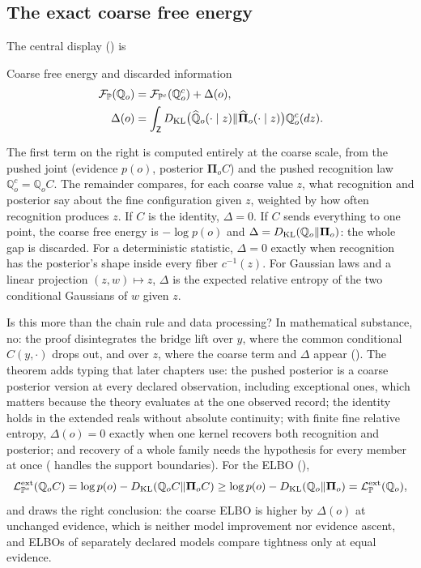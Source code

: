 \subsection{The exact coarse free energy}

The central display () is
\begin{keyequation}{Coarse free energy and discarded information}
\[
\begin{aligned}
\mathcal F_{\mathbb P}(\mathbb Q_o)
&=\mathcal F_{\mathbb P^c}(\mathbb Q^c_o)+\Delta(o),\\
\Delta(o)&=\int_{\mathsf Z}D_{\mathrm{KL}}\bigl(\widehat{\mathbb Q}_o(\cdot\mid z)\Vert\widehat{\boldsymbol\Pi}_o(\cdot\mid z)\bigr)\mathbb Q^c_o(dz).
\end{aligned}
\]
\end{keyequation}
The first term on the right is computed entirely at the coarse scale, from the pushed joint (evidence
$p(o)$, posterior $\boldsymbol\Pi_oC$) and the pushed recognition law $\mathbb Q^c_o=\mathbb Q_oC$. The
remainder compares, for each coarse value $z$, what recognition and posterior say about the fine
configuration given $z$, weighted by how often recognition produces $z$. If $C$ is the identity,
$\Delta=0$. If $C$ sends everything to one point, the coarse free energy is $-\log p(o)$ and
$\Delta=D_{\mathrm{KL}}(\mathbb Q_o\Vert\boldsymbol\Pi_o)$: the whole gap is discarded. For a deterministic
statistic, $\Delta=0$ exactly when recognition has the posterior's shape inside every fiber
$c^{-1}(z)$. For Gaussian laws and a linear projection $(z,w)\mapsto z$, $\Delta$ is the expected
relative entropy of the two conditional Gaussians of $w$ given $z$.

Is this more than the chain rule and data processing? In mathematical substance, no: the proof
disintegrates the bridge lift over $y$, where the common conditional $C(y,\cdot)$ drops out, and over
$z$, where the coarse term and $\Delta$ appear (). The theorem adds typing
that later chapters use: the pushed posterior is a coarse posterior version at every declared
observation, including exceptional ones, which matters because the theory evaluates at the one observed
record; the identity holds in the extended reals without absolute continuity; with finite fine relative
entropy, $\Delta(o)=0$ exactly when one kernel recovers both recognition and posterior; and recovery of
a whole family needs the hypothesis for every member at once ( handles the
support boundaries). For the ELBO (),
\[
\mathcal L^{\mathrm{ext}}_{\mathbb P^c}(\mathbb Q_oC)
=\log p(o)-D_{\mathrm{KL}}(\mathbb Q_oC\Vert\boldsymbol\Pi_oC)
\geq\log p(o)-D_{\mathrm{KL}}(\mathbb Q_o\Vert\boldsymbol\Pi_o)
=\mathcal L^{\mathrm{ext}}_{\mathbb P}(\mathbb Q_o),
\]
and  draws the right conclusion: the coarse ELBO is higher by
$\Delta(o)$ at unchanged evidence, which is neither model improvement nor evidence ascent, and ELBOs of
separately declared models compare tightness only at equal evidence.

